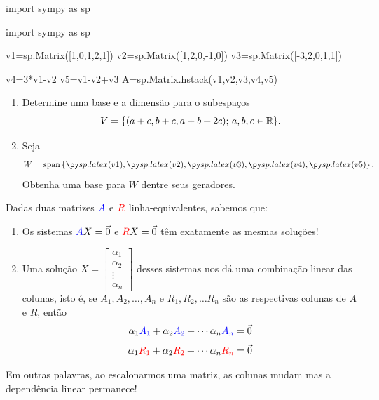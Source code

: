 \begin{frame}[label=lild,fragile]
\begin{pycode} 
import sympy as sp

import sympy as sp

v1=sp.Matrix([1,0,1,2,1])
v2=sp.Matrix([1,2,0,-1,0])
v3=sp.Matrix([-3,2,0,1,1])

v4=3*v1-v2
v5=v1-v2+v3
A=sp.Matrix.hstack(v1,v2,v3,v4,v5)
\end{pycode} 
\begin{exe}
 
\begin{enumerate}
\item Determine uma base e a dimensão para o subespaços
\[V=\{(a+c,b+c,a+b+2c);\, a,b,c\in \mathbb{R}\}.\]
\item Seja
\[W=\operatorname{span}\left\{ \pyl{v1},\pyl{v2},\pyl{v3},\pyl{v4},\pyl{v5} \right\}.\]
Obtenha uma base para \(W\) dentre seus geradores.
\end{enumerate} 
\end{exe}
\end{frame}
\begin{frame}[label=lild]{ }

Dadas duas matrizes ${\color{blue}A}$ e ${\color{red}R}$ linha-equivalentes, sabemos que:
\begin{enumerate}
\item  Os sistemas ${\color{blue}A}X=\vec{0}$ e ${\color{red}R}X=\vec{0}$ {\color{red}têm exatamente as mesmas soluções!}
\item Uma solução $X=\begin{bmatrix}
\alpha_1\\ \alpha_2 \\ \vdots \\ \alpha_n
\end{bmatrix}$ desses sistemas nos dá uma combinação linear das colunas, isto é, se {\color{blue}$A_1, A_2, \ldots, A_n$} e {\color{red}$R_1, R_2,\ldots R_n$} são as respectivas colunas de {\color{blue}$A$} e {\color{red}$R$}, então
\[\alpha_1{\color{blue}A_1}+\alpha_2{\color{blue}A_2}+\cdots \alpha_n{\color{blue}A_n}=\vec{0}\]
\[\alpha_1{\color{red}R_1}+\alpha_2{\color{red}R_2}+\cdots \alpha_n{\color{red}R_n}=\vec{0}\]
\end{enumerate}
Em outras palavras,  ao escalonarmos uma matriz, {\color{red} as colunas mudam mas a dependência linear permanece!}

\end{frame}

